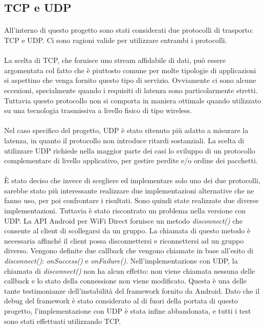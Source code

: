 \documentclass{llncs}
\begin{document}
\subsection{TCP e UDP}
\paragraph{} All'interno di questo progetto sono stati considerati due protocolli di trasporto: TCP e UDP. Ci sono ragioni valide per utilizzare entrambi i protocolli.
\paragraph{} La scelta di TCP, che fornisce uno stream affidabile di dati, può essere argomentata col fatto che è piuttosto comune per molte
tipologie di applicazioni si aspettino che venga fornito questo tipo di servizio. Ovviamente ci sono alcune eccezioni, specialmente quando i requisiti di
latenza sono particolarmente stretti. Tuttavia questo protocollo non si comporta in maniera ottimale quando utilizzato su una tecnologia trasmissiva a livello fisico di tipo wireless.
\paragraph{} Nel caso specifico del progetto, UDP è stato ritenuto più adatto a misurare la latenza, in quanto il protocollo non introduce ritardi sostanziali.
La scelta di utilizzare UDP richiede nella maggior parte dei casi lo sviluppo di un protocollo complementare di livello applicativo, per gestire perdite e/o ordine dei pacchetti.
\paragraph{} È stato deciso che invece di scegliere ed implementare solo uno dei due protocolli, sarebbe stato più interessante realizzare due implementazioni alternative che ne fanno uso, per poi confrontare i risultati. Sono quindi state realizzate due diverse implementazioni. Tuttavia è stato riscontrato un
problema nella versione con UDP. La API Android per WiFi Direct fornisce un metodo \emph{disconnect()} che consente al client di scollegarsi da un gruppo. La chiamata di questo metodo è necessaria affinché il client possa disconnettersi e riconnettersi ad un gruppo diverso. Vengono definite due callback che vengono
chiamate in base all'esito di \emph{disconnect()}: \emph{onSuccess()} e \emph{onFailure()}. Nell'implementazione con UDP, la chiamata di \emph{disconnect()}
non ha alcun effetto: non viene chiamata nessuna delle callback e lo stato della connessione non viene modificato. Questa è una delle tante testimonianze
dell'instabilità del framework fornito da Android. Dato che il debug del framework è stato considerato al di fuori della portata di questo progetto,
l'implementazione con UDP è stata infine abbandonata, e tutti i test sono stati effettuati utilizzando TCP.
		
\end{document}
